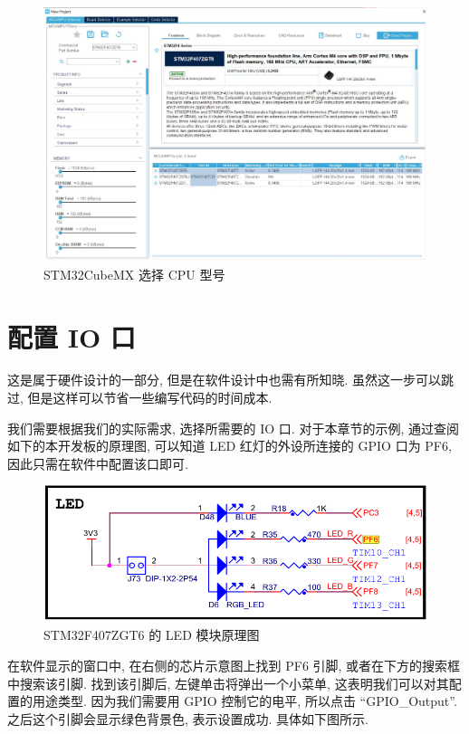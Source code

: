 \begin{figure}[H]
    \centering
    \includegraphics[width=\textwidth]{images/1-newproj-selectmodel.jpg}
    \caption{STM32CubeMX 选择 CPU 型号}
\end{figure}

\section{配置 IO 口}
这是属于硬件设计的一部分, 但是在软件设计中也需有所知晓. 虽然这一步可以跳过, 但是这样可以节省一些编写代码的时间成本.

我们需要根据我们的实际需求, 选择所需要的 IO 口. 对于本章节的示例, 通过查阅如下的本开发板的原理图, 可以知道 LED 红灯的外设所连接的 GPIO 口为 PF6, 因此只需在软件中配置该口即可.

\begin{figure}[H]
    \centering
    \includegraphics[width=.8\textwidth]{images/1-newproj-led.png}
    \caption{STM32F407ZGT6 的 LED 模块原理图} \label{fig:1-newproj led}
\end{figure}

在软件显示的窗口中, 在右侧的芯片示意图上找到 PF6 引脚, 或者在下方的搜索框中搜索该引脚. 找到该引脚后, 左键单击将弹出一个小菜单, 这表明我们可以对其配置的用途类型. 因为我们需要用 GPIO 控制它的电平, 所以点击 ``GPIO\_Output''. 之后这个引脚会显示绿色背景色, 表示设置成功. 具体如下图所示.

